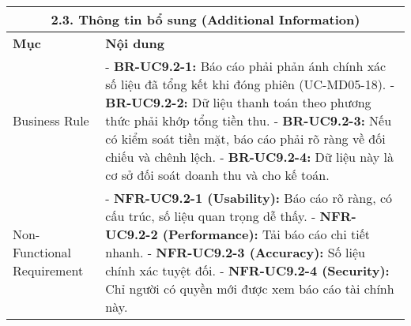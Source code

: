 \begin{longtable}{|m{4cm}|p{11cm}|}
\hline
\multicolumn{2}{|c|}{\textbf{2.3. Thông tin bổ sung (Additional Information)}} \\
\hline
\textbf{Mục} & \textbf{Nội dung} \\
\hline
Business Rule & - \textbf{BR-UC9.2-1:} Báo cáo phải phản ánh chính xác số liệu đã tổng kết khi đóng phiên (UC-MD05-18). \newline - \textbf{BR-UC9.2-2:} Dữ liệu thanh toán theo phương thức phải khớp tổng tiền thu. \newline - \textbf{BR-UC9.2-3:} Nếu có kiểm soát tiền mặt, báo cáo phải rõ ràng về đối chiếu và chênh lệch. \newline - \textbf{BR-UC9.2-4:} Dữ liệu này là cơ sở đối soát doanh thu và cho kế toán. \\
\hline
Non-Functional Requirement & - \textbf{NFR-UC9.2-1 (Usability):} Báo cáo rõ ràng, có cấu trúc, số liệu quan trọng dễ thấy. \newline - \textbf{NFR-UC9.2-2 (Performance):} Tải báo cáo chi tiết nhanh. \newline - \textbf{NFR-UC9.2-3 (Accuracy):} Số liệu chính xác tuyệt đối. \newline - \textbf{NFR-UC9.2-4 (Security):} Chỉ người có quyền mới được xem báo cáo tài chính này. \\
\hline
\end{longtable}

